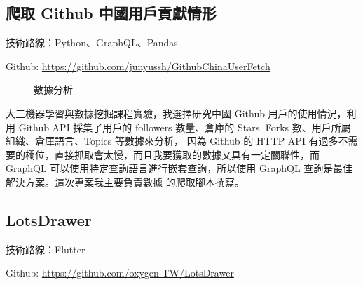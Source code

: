 \documentclass[classical]{einfart}
\begin{document}
\subsection{爬取 Github 中國用戶貢獻情形}

技術路線：Python、GraphQL、Pandas

Github: \url{https://github.com/junyussh/GithubChinaUserFetch}

\begin{figure}[H]
    \centering
    \caption{數據分析}
\end{figure}

大三機器學習與數據挖掘課程實驗，我選擇研究中國 Github 用戶的使用情況，利用 Github API 採集了用戶的 followers 數量、倉庫的 Stars, Forks 數、用戶所屬組織、倉庫語言、Topics 等數據來分析，
因為 Github 的 HTTP API 有過多不需要的欄位，直接抓取會太慢，而且我要獲取的數據又具有一定關聯性，而 GraphQL 可以使用特定查詢語言進行嵌套查詢，所以使用 GraphQL 查詢是最佳解決方案。這次專案我主要負責數據
的爬取腳本撰寫。

\subsection{LotsDrawer}

技術路線：Flutter

Github: \url{https://github.com/oxygen-TW/LotsDrawer}
\end{document}
